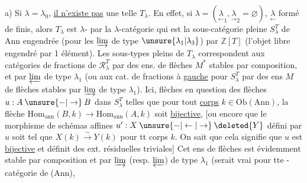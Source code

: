 a) Si $\lambda=\lambda_0$, \uline{il n'existe pas} une telle $T_\lambda$. En effet,  
si $\lambda=(\underset{\leftarrow}{\lambda}_1,\underset{\rightarrow}{\lambda}_2=\varnothing)$, $\underset{\leftarrow}{\lambda}$ formé de  finis, alors
$T_\lambda$ est $\lambda$- par la $\lambda$-catégorie  qui est  la sous-catégorie pleine $S_\lambda^T$ de Ann engendrée (pour les $\varinjlim$ de type $\unsure{\lambda_1|\lambda_3}$)
par $\mathbb Z[T]$ (l'objet libre engendré par 1 élément). Les sous-types pleins de $T_\lambda$  correspondent aux
catégories de fractions de $\mathcal R_\lambda^T$ par des ens. de flèches $M^*$
stables par composition, et par $\varprojlim$ de type $\lambda_1$ (ou aux
cat.  de fractions à \uline{gauche} pour $S_\lambda^T$ par des ens
$M$ de flèches stables par $\varinjlim$ de type $\lambda_1$). Ici, 
flèches en question   des flèches $u:A\mathbin{\unsure{-|\to}}B$
dans $S_\lambda^T$  telles que pour tout  \uline{corps} $k\in\mathrm{Ob}(\mathrm{Ann})$,
la flèche $\mathrm{Hom}_{\mathrm{ann}}(B,k)\longrightarrow\mathrm{Hom}_{\mathrm{ann}}(A,k)$ soit \uline{bijective}, [ou
encore que le  morphisme de schémas affines $u':X\mathbin{\unsure{-|\leftarrow|\to}}\deleted{Y}$
défini par $u$ soit tel que $X(k)\xrightarrow{\sim}Y(k)$ pour tt corps $k$.
On sait que cela signifie que $u$ est \uline{bijective} et définit
des ext. résiduelles triviales]  Cet ens de flèches
est évidemment stable par composition et par $\varinjlim$ (resp. $\varprojlim$)
de type $\lambda_1$ (serait vrai pour tte -catégorie de (Ann),
